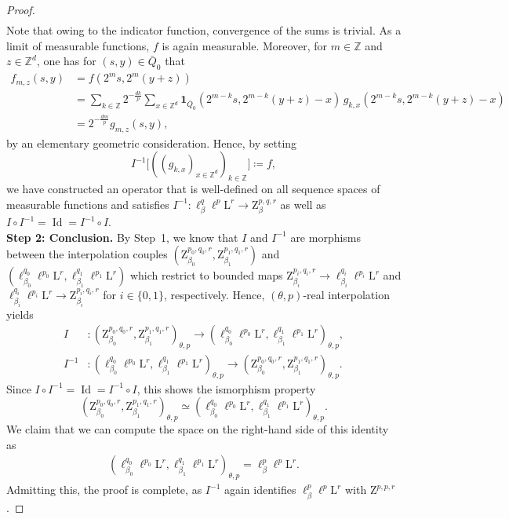 \documentclass[11pt, leqno,parskip=half]{amsart}
\theoremstyle{definition}
\newcommand{\IZ}{\mathbb{Z}}
\renewcommand{\L}{\mathrm{L}}
\newcommand{\Z}{\mathrm{Z}}
\DeclareMathOperator{\Id}{Id}
\numberwithin{equation}{section}
\begin{document}
\begin{proof}
\begin{align*}
    \end{align*}
    Note that owing to the indicator function, convergence of the sums is trivial.
    As a limit of measurable functions, $f$ is again measurable. Moreover, for $m\in\IZ$ and $z\in\IZ^d$, one has for $(s,y)\in \bar Q_0$ that
    \begin{align*}
        f_{m,z}(s,y) &=f(2^ms , 2^m(y+z))\\
        &=\sum\limits_{k\in\IZ} 2^{-\frac{dk}{p}}\sum\limits_{x\in\IZ^d} \mathbf{1}_{\bar Q_0}(2^{m-k}s,2^{m-k}(y+z)-x) \, g_{k,x}(2^{m-k}s , 2^{m-k}(y+z)-x) \\
        &=2^{-\frac{dm}{p}} g_{m,z}(s,y),
    \end{align*}
    by an elementary geometric consideration.
    Hence, by setting $$I^{-1}\bigl[((g_{k,x})_{x\in \IZ^d})_{k\in \IZ} \bigr] \coloneqq f,$$ we have constructed an operator that is well-defined on all sequence spaces of measurable functions and satisfies $I^{-1} \colon \ell^q_\beta\ell^p\L^r \to \Z^{p,q,r}_\beta$ as well as $I \circ I^{-1} = \Id = I^{-1} \circ I$. \\


    \noindent \textbf{Step 2: Conclusion.}
    By Step~1, we know that $I$ and $I^{-1}$ are morphisms between the interpolation couples $(\Z^{p_0,q_0,r}_{\beta_0}, \Z^{p_1,q_1,r}_{\beta_1})$ and $(\ell^{q_0}_{\beta_0}\ell^{p_0}\L^r, \ell^{q_1}_{\beta_1}\ell^{p_1}\L^r)$ which restrict to bounded maps $\Z^{p_i,q_i,r}_{\beta_i} \to \ell^{q_i}_{\beta_i}\ell^{p_i}\L^r$ and $\ell^{q_i}_{\beta_i}\ell^{p_i}\L^r \to \Z^{p_i,q_i,r}_{\beta_i}$ for $i \in \{0,1\}$, respectively. Hence, $(\theta,p)$-real interpolation yields
    \begin{align}
        I &\colon (\Z^{p_0,q_0,r}_{\beta_0} , \Z^{p_1,q_1,r}_{\beta_1} )_{\theta, p} \to (\ell^{q_0}_{\beta_0}\ell^{p_0}\L^r , \ell^{q_1}_{\beta_1}\ell^{p_1}\L^r)_{\theta, p}, \\
        I^{-1} &\colon (\ell^{q_0}_{\beta_0}\ell^{p_0}\L^r , \ell^{q_1}_{\beta_1}\ell^{p_1}\L^r)_{\theta, p} \to (\Z^{p_0,q_0,r}_{\beta_0} , \Z^{p_1,q_1,r}_{\beta_1} )_{\theta, p}.
    \end{align}
    Since $I \circ I^{-1} = \Id = I^{-1} \circ I$, this shows the ismorphism property $$(\Z^{p_0,q_0,r}_{\beta_0} , \Z^{p_1,q_1,r}_{\beta_1} )_{\theta, p} \simeq (\ell^{q_0}_{\beta_0}\ell^{p_0}\L^r , \ell^{q_1}_{\beta_1}\ell^{p_1}\L^r)_{\theta, p}.$$
    We claim that we can compute the space on the right-hand side of this identity as
    \begin{align}
    \label{eq: int ident l}
        (\ell^{q_0}_{\beta_0}\ell^{p_0}\L^r , \ell^{q_1}_{\beta_1}\ell^{p_1}\L^r)_{\theta, p} = \ell^{p}_{\beta}\ell^{p}\L^r.
    \end{align}
    Admitting this, the proof is complete, as $I^{-1}$ again identifies $\ell^{p}_{\beta}\ell^{p}\L^r$ with $\Z^{p,p,r}$.


\end{proof}
\end{document}
